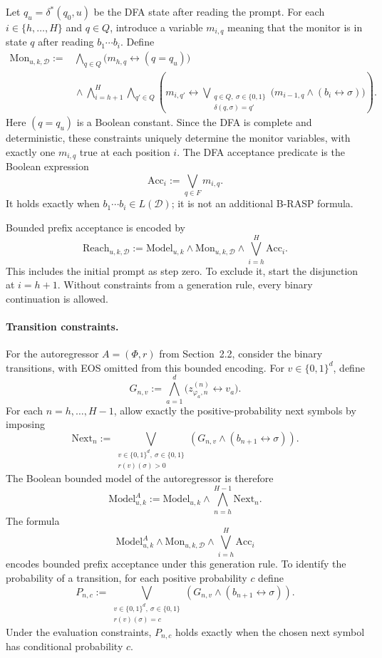 \documentclass[acmsmall,screen,review,anonymous,nonacm]{PLDI/acmart}
\begin{document}
Let $q_u=\delta^*(q_0,u)$ be the DFA state after reading the prompt.
For each $i\in\{h,\ldots,H\}$ and $q\in Q$, introduce a variable
$m_{i,q}$ meaning that the monitor is in state $q$ after reading
$b_1\cdots b_i$. Define
\[
\begin{aligned}
\mathrm{Mon}_{u,k,\mathcal D}:={}&
\bigwedge_{q\in Q}\bigl(m_{h,q}\leftrightarrow(q=q_u)\bigr)
\\
&{}\wedge
\bigwedge_{i=h+1}^{H}\bigwedge_{q'\in Q}
\left(
m_{i,q'}\leftrightarrow
\bigvee_{\substack{q\in Q,\ \sigma\in\{0,1\}\\
                   \delta(q,\sigma)=q'}}
\bigl(m_{i-1,q}\wedge(b_i\leftrightarrow\sigma)\bigr)
\right).
\end{aligned}
\]
Here $(q=q_u)$ is a Boolean constant. Since the DFA is complete and
deterministic, these constraints uniquely determine the monitor
variables, with exactly one $m_{i,q}$ true at each position $i$.
The DFA acceptance predicate is the Boolean expression
\[
\mathrm{Acc}_i:=\bigvee_{q\in F}m_{i,q}.
\]
It holds exactly when $b_1\cdots b_i\in L(\mathcal D)$; it is not
an additional B-RASP formula.

Bounded prefix acceptance is encoded by
\[
\mathrm{Reach}_{u,k,\mathcal D}:=
\mathrm{Model}_{u,k}\wedge\mathrm{Mon}_{u,k,\mathcal D}
\wedge\bigvee_{i=h}^{H}\mathrm{Acc}_i.
\]
This includes the initial prompt as step zero. To exclude it, start
the disjunction at $i=h+1$. Without constraints from a generation
rule, every binary continuation is allowed.

\paragraph{Transition constraints.}

For the autoregressor $A=(\Phi,r)$ from Section~2.2, consider the
binary transitions, with EOS omitted from this bounded encoding.
For $v\in\{0,1\}^d$, define
\[
G_{n,v}:=\bigwedge_{a=1}^{d}
\bigl(z^{(n)}_{\varphi_a,n}\leftrightarrow v_a\bigr).
\]
For each $n=h,\ldots,H-1$, allow exactly the positive-probability
next symbols by imposing
\[
\mathrm{Next}_n:=
\bigvee_{\substack{v\in\{0,1\}^d,\ \sigma\in\{0,1\}\\r(v)(\sigma)>0}}
\left(G_{n,v}\wedge(b_{n+1}\leftrightarrow\sigma)\right).
\]
The Boolean bounded model of the autoregressor is therefore
\[
\mathrm{Model}^{A}_{u,k}:=
\mathrm{Model}_{u,k}\wedge
\bigwedge_{n=h}^{H-1}\mathrm{Next}_n.
\]
The formula
\[
\mathrm{Model}^{A}_{u,k}\wedge\mathrm{Mon}_{u,k,\mathcal D}
\wedge\bigvee_{i=h}^{H}\mathrm{Acc}_i
\]
encodes bounded prefix acceptance under this generation rule.
To identify the probability of a transition, for each positive
probability $c$ define
\[
P_{n,c}:=
\bigvee_{\substack{v\in\{0,1\}^d,\ \sigma\in\{0,1\}\\r(v)(\sigma)=c}}
\left(G_{n,v}\wedge(b_{n+1}\leftrightarrow\sigma)\right).
\]
Under the evaluation constraints, $P_{n,c}$ holds exactly when the
chosen next symbol has conditional probability $c$.
\end{document}
